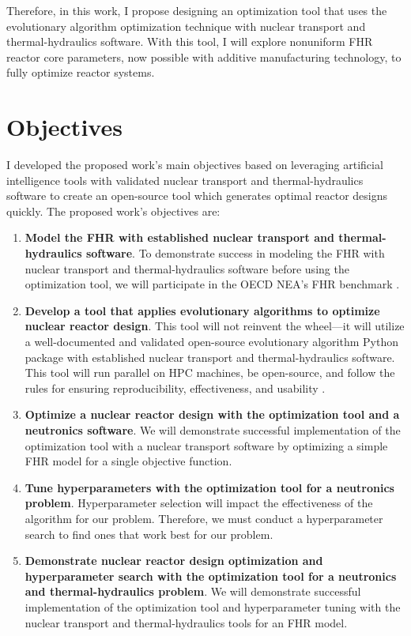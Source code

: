 Therefore, in this work, I propose designing an optimization tool that uses 
the evolutionary algorithm optimization technique with nuclear transport and 
thermal-hydraulics software. 
With this tool, I will explore nonuniform FHR reactor core parameters, now 
possible with additive manufacturing technology, to fully optimize reactor systems. 

\section{Objectives}
I developed the proposed work's main objectives based on leveraging 
artificial intelligence tools with validated nuclear transport and 
thermal-hydraulics software to create an open-source tool which 
generates optimal reactor designs quickly. 
The proposed work's objectives are: 

\vspace{0.2cm} 
\noindent
\begin{enumerate}[label=\textbf{\Roman*}]
\item \textbf{Model the \gls{FHR} with established 
nuclear transport and thermal-hydraulics software}.
To demonstrate success in modeling the \gls{FHR} with nuclear transport and 
thermal-hydraulics software before using the optimization tool, we will 
participate in the \gls{OECD} \gls{NEA}'s \gls{FHR} benchmark 
\cite{noauthor_fluoride_nodate}. 

\item \textbf{Develop a tool that applies evolutionary algorithms to optimize nuclear 
reactor design}. 
This tool will not reinvent the wheel---it will utilize a well-documented 
and validated open-source evolutionary algorithm Python package with established 
nuclear transport and thermal-hydraulics software. This tool will run parallel on 
\gls{HPC} machines, be open-source, and follow the rules for ensuring 
reproducibility, effectiveness, and usability 
\cite{list_ten_2017,osborne_ten_2014,sandve_ten_2013}. 

\item \textbf{Optimize a nuclear reactor design with the optimization tool and a 
neutronics software}. 
We will demonstrate successful implementation of the optimization tool with a
nuclear transport software by optimizing a simple \gls{FHR} model for a single 
objective function. 

\item \textbf{Tune hyperparameters with the optimization tool for a neutronics problem}.
Hyperparameter selection will impact the effectiveness of the algorithm 
for our problem. 
Therefore, we must conduct a hyperparameter search to find ones that work best 
for our problem. 

\item \textbf{Demonstrate nuclear reactor design optimization and hyperparameter 
search with the optimization tool for a neutronics and thermal-hydraulics problem}.
We will demonstrate successful implementation of the optimization tool and 
hyperparameter tuning with the nuclear transport and thermal-hydraulics tools 
for an \gls{FHR} model.  
\end{enumerate}

